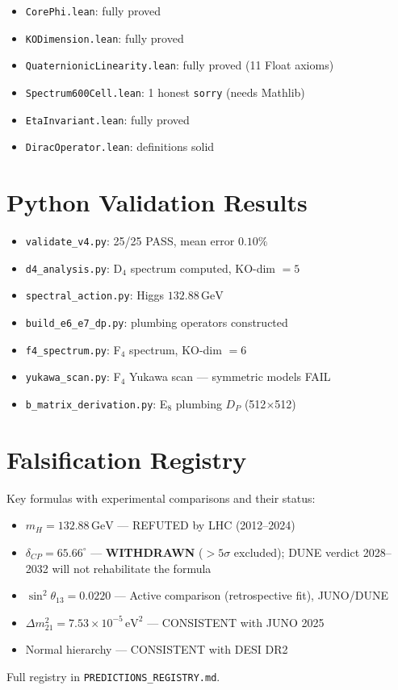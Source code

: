 \documentclass[11pt,a4paper]{article}
\theoremstyle{definition}
\begin{document}
\begin{itemize}
  \item \texttt{CorePhi.lean}: fully proved
  \item \texttt{KODimension.lean}: fully proved
  \item \texttt{QuaternionicLinearity.lean}: fully proved (11 Float axioms)
  \item \texttt{Spectrum600Cell.lean}: 1 honest \texttt{sorry} (needs Mathlib)
  \item \texttt{EtaInvariant.lean}: fully proved
  \item \texttt{DiracOperator.lean}: definitions solid
\end{itemize}

\section{Python Validation Results}\label{app:python}

\begin{itemize}
  \item \texttt{validate\_v4.py}: 25/25 PASS, mean error $0.10\%$
  \item \texttt{d4\_analysis.py}: D$_4$ spectrum computed, KO-dim $= 5$
  \item \texttt{spectral\_action.py}: Higgs $132.88\,\text{GeV}$
  \item \texttt{build\_e6\_e7\_dp.py}: plumbing operators constructed
  \item \texttt{f4\_spectrum.py}: F$_4$ spectrum, KO-dim $= 6$
  \item \texttt{yukawa\_scan.py}: F$_4$ Yukawa scan --- symmetric models FAIL
  \item \texttt{b\_matrix\_derivation.py}: E$_8$ plumbing $D_P$ (512$\times$512)
\end{itemize}

\section{Falsification Registry}\label{app:falsify}

Key formulas with experimental comparisons and their status:
\begin{itemize}
  \item $m_H = 132.88\,\text{GeV}$ --- REFUTED by LHC (2012--2024)
  \item $\delta_{CP} = 65.66^\circ$ --- \textbf{WITHDRAWN} ($>5\sigma$ excluded);
    DUNE verdict 2028--2032 will not rehabilitate the formula
  \item $\sin^2\theta_{13} = 0.0220$ --- Active comparison (retrospective fit), JUNO/DUNE
  \item $\Delta m^2_{21} = 7.53 \times 10^{-5}\,\text{eV}^2$ --- CONSISTENT
    with JUNO 2025
  \item Normal hierarchy --- CONSISTENT with DESI DR2
\end{itemize}
Full registry in \texttt{PREDICTIONS\_REGISTRY.md}.
\end{document}
